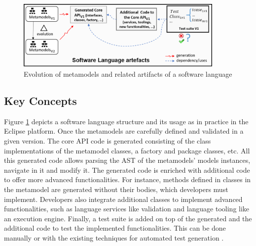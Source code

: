 \begin{figure}[tb]
	\centering
	\includegraphics[width=0.9\textwidth]{./pics/chapter2pics/background.png}
	\caption{Evolution of metamodels and related artifacts of a software language}
	\label{fig:SL_useage}
\end{figure}


\subsection{Key Concepts}

Figure \ref{fig:SL_useage} depicts a software language structure and its usage as in practice in the Eclipse platform.  
%
Once the metamodels are carefully defined and validated in a given version. The core API code is generated \cite{steinberg2008emf} consisting of the class implementations of the metamodel classes, a factory and package classes, etc. All this generated code allows parsing the AST of the metamodels' models instances, navigate in it and modify it. 
The generated code is enriched with additional code to offer more advanced functionalities. For instance, methods defined in classes in the metamodel are generated without their bodies, which developers must implement. %
Developers also integrate additional classes to implement advanced functionalities, such as language services like validation and language tooling like an execution engine. %
%
Finally, a test suite is added on top of the generated and the additional code to test the implemented functionalities. This can be done manually or with the existing techniques for automated test generation \cite{fraser2011evosuite,mcminn2004search,beyer2022advances}. 

